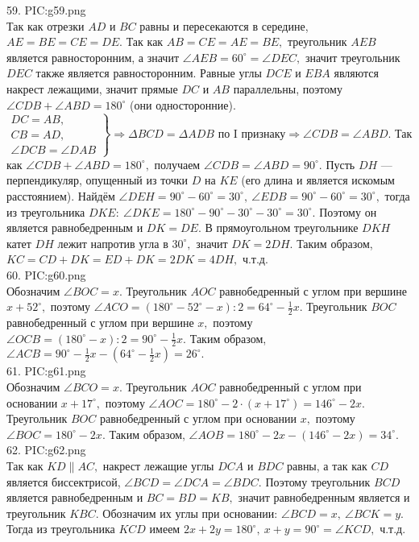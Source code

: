 59. {{PIC:g59.png}}\\
Так как отрезки $AD$ и $BC$ равны и пересекаются в середине, $AE=BE=CE=DE.$ Так как $AB=CE=AE=BE,$ треугольник $AEB$ является равносторонним, а значит $\angle AEB=60^\circ=\angle DEC,$ значит треугольник $DEC$ также является равносторонним. Равные углы $DCE$ и $EBA$ являются накрест лежащими, значит прямые $DC$ и $AB$ параллельны, поэтому $\angle CDB+\angle ABD=180^\circ$ (они односторонние). $\left.\begin{array}{l}DC=AB,\\
CB=AD,\\
\angle DCB=\angle DAB  \end{array}\right\}\Rightarrow \Delta BCD=\Delta ADB\text{ по I признаку}\Rightarrow \angle CDB=\angle ABD.$ Так как $\angle CDB+\angle ABD=180^\circ,$ получаем $\angle CDB=\angle ABD=90^\circ.$ Пусть $DH$ --- перпендикуляр, опущенный из точки $D$ на $KE$ (его длина и является искомым расстоянием). Найдём $\angle DEH=90^\circ-60^\circ=30^\circ,\ \angle EDB=90^\circ-60^\circ=30^\circ,$ тогда из треугольника $DKE:\ \angle DKE=180^\circ-90^\circ-30^\circ-30^\circ=30^\circ.$ Поэтому он является равнобедренным и $DK=DE.$ В прямоугольном треугольнике $DKH$ катет $DH$ лежит напротив угла в $30^\circ,$ значит $DK=2DH.$ Таким образом, $KC=CD+DK=ED+DK=2DK=4DH,$ ч.т.д.\\
60. {{PIC:g60.png}}\\
Обозначим $\angle BOC=x.$ Треугольник $AOC$ равнобедренный с углом при вершине $x+52^\circ,$ поэтому $\angle ACO=(180^\circ-52^\circ-x):2=64^\circ-\frac{1}{2}x.$ Треугольник $BOC$ равнобедренный с углом при вершине $x,$ поэтому $\angle OCB=(180^\circ-x):2=90^\circ-\frac{1}{2}x.$ Таким образом, $\angle ACB=90^\circ-\frac{1}{2}x-(64^\circ-\frac{1}{2}x)=26^\circ.$\\
61. {{PIC:g61.png}}\\
Обозначим $\angle BCO=x.$ Треугольник $AOC$ равнобедренный с углом при основании $x+17^\circ,$ поэтому $\angle AOC=180^\circ-2\cdot(x+17^\circ)=146^\circ-2x.$ Треугольник $BOC$ равнобедренный с углом при основании $x,$ поэтому $\angle BOC=180^\circ-2x.$ Таким образом, $\angle AOB=180^\circ-2x-(146^\circ-2x)=34^\circ.$\\
62. {{PIC:g62.png}}\\
Так как $KD\parallel AC,$ накрест лежащие углы $DCA$ и $BDC$ равны, а так как $CD$ является биссектрисой, $\angle BCD=\angle DCA=\angle BDC.$ Поэтому треугольник $BCD$ является равнобедренным и $BC=BD=KB,$ значит равнобедренным является и треугольник $KBC.$ Обозначим их углы при основании: $\angle BCD=x,\ \angle BCK=y.$ Тогда из треугольника $KCD$ имеем $2x+2y=180^\circ,\ x+y=90^\circ=\angle KCD,$ ч.т.д.\newpage\noindent
